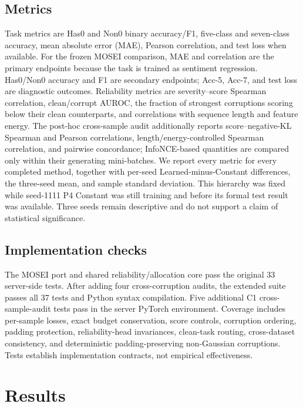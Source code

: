 \subsection{Metrics}\label{metrics}

Task metrics are Has0 and Non0 binary accuracy/F1, five-class and
seven-class accuracy, mean absolute error (MAE), Pearson correlation,
and test loss when available. For the frozen MOSEI comparison, MAE and
correlation are the primary endpoints because the task is trained as
sentiment regression. Has0/Non0 accuracy and F1 are secondary endpoints;
Acc-5, Acc-7, and test loss are diagnostic outcomes. Reliability metrics
are severity--score Spearman correlation, clean/corrupt AUROC, the fraction
of strongest corruptions scoring below their clean counterparts, and
correlations with sequence length and feature energy. The post-hoc
cross-sample audit additionally reports score--negative-KL Spearman and
Pearson correlations, length/energy-controlled Spearman correlation, and
pairwise concordance; InfoNCE-based quantities are compared only within their
generating mini-batches. We report every metric
for every completed method, together with per-seed Learned-minus-Constant
differences, the three-seed mean, and sample standard deviation. This
hierarchy was fixed while seed-1111 P4 Constant was still training and before
its formal test result was available. Three seeds remain descriptive and do
not support a claim of statistical significance.

\subsection{Implementation checks}\label{implementation-checks}

The MOSEI port and shared reliability/allocation core pass the original 33
server-side tests. After adding four cross-corruption audits, the extended
suite passes all 37 tests and Python syntax compilation. Five additional C1
cross-sample-audit tests pass in the server PyTorch environment. Coverage
includes per-sample losses, exact budget conservation, score controls, corruption
ordering, padding protection, reliability-head invariances, clean-task
routing, cross-dataset consistency, and deterministic padding-preserving
non-Gaussian corruptions. Tests establish implementation contracts, not
empirical effectiveness.

\section{Results}\label{results}

